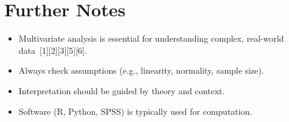 \documentclass[11pt]{article}
\begin{document}
\section{Further Notes}

\begin{itemize}
    \item Multivariate analysis is essential for understanding complex, real-world data\ [1][2][3][5][6].
    \item Always check assumptions (e.g., linearity, normality, sample size).
    \item Interpretation should be guided by theory and context.
    \item Software (R, Python, SPSS) is typically used for computation.
\end{itemize}
\end{document}
